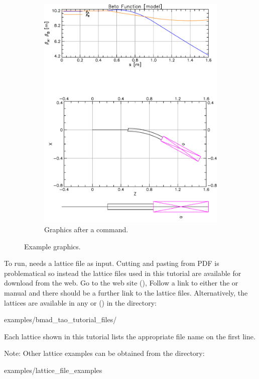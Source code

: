\documentclass{hitec}
\begin{document}
\begin{figure}[tb]
\begin{subfigure}[b]{0.47\textwidth}
    \includegraphics[width=\textwidth]{lat-floor.pdf}
    \caption{Graphics after a  command.}
    \label{f:lat.floor}
  \end{subfigure}
  \caption{Example \tao graphics.}
\end{figure}

To run, \tao needs a lattice file as input.  Cutting and pasting from PDF is problematical so
instead the lattice files used in this tutorial are available for download from the web. Go to the
\bmad web site (), Follow a link to either the \bmad or \tao manual and there
should be a further link to the lattice files. Alternatively, the lattices are available in any
 or  () in the directory:
\begin{code}
examples/bmad_tao_tutorial_files/
\end{code}
Each lattice shown in this tutorial lists the appropriate file name on the first line.

Note: Other lattice examples can be obtained from the directory:
\begin{code}
examples/lattice_file_examples
\end{code}
\end{document}
